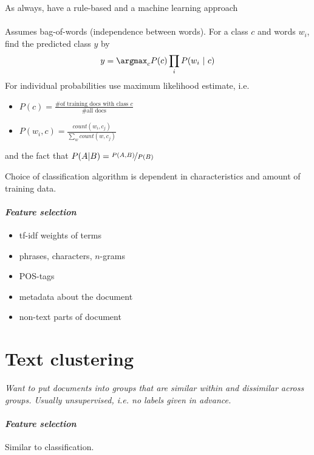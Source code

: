 \documentclass[10pt,twocolumn]{article}
\begin{document}
As always, have a rule-based and a machine learning approach

\paragraph{ }  Assumes
bag-of-words (independence between words). For a class $c$ and words $w_i$, find
the predicted class $y$ by
\begin{align*}
  y = \argmax_c P(c) \prod_i P(w_i~|~c)
\end{align*}
For individual probabilities use maximum likelihood estimate, i.e.
\begin{itemize}
\item $P(c) = \frac{\text{\# of training docs with class $c$}}{\text{ \# all docs }}$
\item $P(w_i, c) = \frac{\mathit{count}(w_i, c_j)}{\sum_w \mathit{count}(w, c_j)}$
\end{itemize}
and the fact that $P(A|B) = \nicefrac{P(A,B)}{P(B)}$

Choice of classification algorithm is dependent in characteristics and amount of
training data.

\paragraph{\textit{Feature selection}}
\begin{itemize}
\item tf-idf weights of terms
\item phrases, characters, $n$-grams
\item POS-tags
\item metadata about the document
\item non-text parts of document
\end{itemize}


\section{Text clustering}

\textit{Want to put documents into groups that are similar within and dissimilar
  across groups. Usually unsupervised, i.e. no labels given in advance.}

\paragraph{\textit{Feature selection}} Similar to classification.
\end{document}

